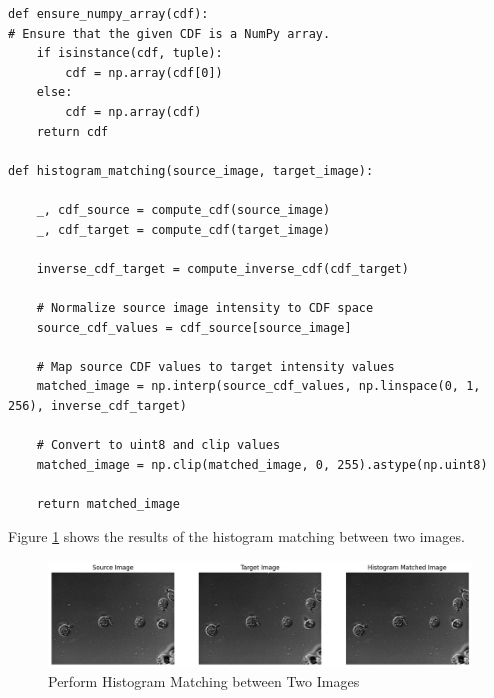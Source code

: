 \documentclass[12pt]{article}
\begin{document}
\begin{lstlisting}[caption={Perform Histogram Matching between Two Images},captionpos=b]
def ensure_numpy_array(cdf):
# Ensure that the given CDF is a NumPy array.
    if isinstance(cdf, tuple):
        cdf = np.array(cdf[0])
    else:
        cdf = np.array(cdf)
    return cdf

def histogram_matching(source_image, target_image):

    _, cdf_source = compute_cdf(source_image)
    _, cdf_target = compute_cdf(target_image)

    inverse_cdf_target = compute_inverse_cdf(cdf_target)

    # Normalize source image intensity to CDF space
    source_cdf_values = cdf_source[source_image]

    # Map source CDF values to target intensity values
    matched_image = np.interp(source_cdf_values, np.linspace(0, 1, 256), inverse_cdf_target)

    # Convert to uint8 and clip values
    matched_image = np.clip(matched_image, 0, 255).astype(np.uint8)

    return matched_image
\end{lstlisting}

Figure \ref{fig:4.4-1} shows the results of the histogram matching between two images.

\begin{figure}[ht]
        \centering
            \includegraphics[width=0.7\columnwidth, keepaspectratio]{pics/a2-4.4-1.png}
        \caption[]{Perform Histogram Matching between Two Images}
    \label{fig:4.4-1}
    \end{figure}
\end{document}
